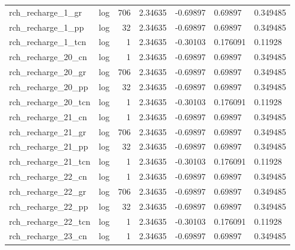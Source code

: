 \documentclass{article}
\begin{document}
\begin{center}
\begin{landscape}
\begin{longtable}{llrllll}
  rch\_recharge\_1\_gr &       log &    706 &        2.34635 &            -0.69897 &            0.69897 &           0.349485 \\
  rch\_recharge\_1\_pp &       log &     32 &        2.34635 &            -0.69897 &            0.69897 &           0.349485 \\
 rch\_recharge\_1\_tcn &       log &      1 &        2.34635 &            -0.30103 &           0.176091 &            0.11928 \\
 rch\_recharge\_20\_cn &       log &      1 &        2.34635 &            -0.69897 &            0.69897 &           0.349485 \\
 rch\_recharge\_20\_gr &       log &    706 &        2.34635 &            -0.69897 &            0.69897 &           0.349485 \\
 rch\_recharge\_20\_pp &       log &     32 &        2.34635 &            -0.69897 &            0.69897 &           0.349485 \\
rch\_recharge\_20\_tcn &       log &      1 &        2.34635 &            -0.30103 &           0.176091 &            0.11928 \\
 rch\_recharge\_21\_cn &       log &      1 &        2.34635 &            -0.69897 &            0.69897 &           0.349485 \\
 rch\_recharge\_21\_gr &       log &    706 &        2.34635 &            -0.69897 &            0.69897 &           0.349485 \\
 rch\_recharge\_21\_pp &       log &     32 &        2.34635 &            -0.69897 &            0.69897 &           0.349485 \\
rch\_recharge\_21\_tcn &       log &      1 &        2.34635 &            -0.30103 &           0.176091 &            0.11928 \\
 rch\_recharge\_22\_cn &       log &      1 &        2.34635 &            -0.69897 &            0.69897 &           0.349485 \\
 rch\_recharge\_22\_gr &       log &    706 &        2.34635 &            -0.69897 &            0.69897 &           0.349485 \\
 rch\_recharge\_22\_pp &       log &     32 &        2.34635 &            -0.69897 &            0.69897 &           0.349485 \\
rch\_recharge\_22\_tcn &       log &      1 &        2.34635 &            -0.30103 &           0.176091 &            0.11928 \\
 rch\_recharge\_23\_cn &       log &      1 &        2.34635 &            -0.69897 &            0.69897 &           0.349485 \\

\end{longtable}
\end{landscape}
\end{center}
\end{document}
